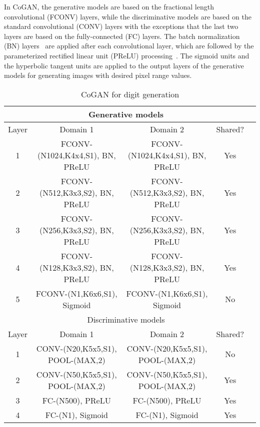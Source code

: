 \documentclass{article}
\begin{document}
In CoGAN, the generative models are based on the fractional length convolutional (FCONV) layers, while the discriminative models are based on the standard convolutional (CONV) layers with the exceptions that the last two layers are based on the fully-connected (FC) layers. The batch normalization (BN) layers~\cite{ioffe2015batch} are applied after each convolutional layer, which are followed by the parameterized rectified linear unit (PReLU) processing~\cite{he2015delving}. The sigmoid units and the hyperbolic tangent units are applied to the output layers of the generative models for generating images with desired pixel range values.



\begin{table*}[thb!]
\small
\centering
{
\caption{CoGAN for digit generation}
\label{tbl::mnist_g}
\begin{tabular}{|c|c|c|c|c|}
\hline
\multicolumn{4}{|c|}{Generative models}\\
\hline\rule{0pt}{2ex}    
Layer &  Domain 1 & Domain 2 & Shared? \\
\hline 
1 &  FCONV-(N1024,K4x4,S1), BN, PReLU & FCONV-(N1024,K4x4,S1), BN, PReLU & Yes\\
2 &  FCONV-(N512,K3x3,S2), BN, PReLU & FCONV-(N512,K3x3,S2), BN, PReLU &Yes\\
3 &  FCONV-(N256,K3x3,S2), BN, PReLU & FCONV-(N256,K3x3,S2), BN, PReLU &Yes\\
4 &  FCONV-(N128,K3x3,S2), BN, PReLU & FCONV-(N128,K3x3,S2), BN, PReLU &Yes\\
5 &  FCONV-(N1,K6x6,S1), Sigmoid & FCONV-(N1,K6x6,S1), Sigmoid & No\\
\hline
\hline
\multicolumn{4}{|c|}{Discriminative models}\\
\hline\rule{0pt}{2ex} 
Layer &  Domain 1 & Domain 2 & Shared? \\
\hline
1 & CONV-(N20,K5x5,S1), POOL-(MAX,2) & CONV-(N20,K5x5,S1), POOL-(MAX,2) &No\\
2 & CONV-(N50,K5x5,S1), POOL-(MAX,2) & CONV-(N50,K5x5,S1), POOL-(MAX,2) &Yes\\
3 & FC-(N500), PReLU & FC-(N500), PReLU &Yes\\
4 & FC-(N1), Sigmoid & FC-(N1), Sigmoid &Yes\\
\hline
\end{tabular}
}
\end{table*}
\end{document}
